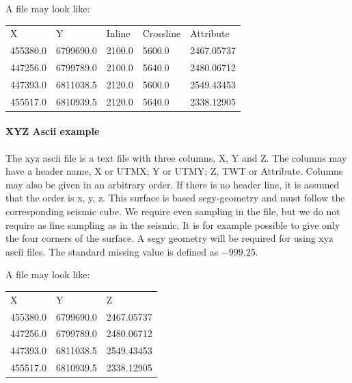 A file may look like:
\begin{table}[h]
\centering
\label{tab:multicolumnascii}
\begin{tabular}{lllll}

X         &         Y              &     Inline       &   Crossline     &    Attribute\\ 
455380.0    &        6799690.0   &        2100.0      &       5600.0       &       2467.05737 \\ 
447256.0    &        6799789.0    &       2100.0       &       5640.0      &        2480.06712\\ 
447393.0    &        6811038.5     &      2120.0      &        5600.0      &        2549.43453\\ 
455517.0    &        6810939.5     &      2120.0      &        5640.0      &        2338.12905\\ 
\end{tabular}
\end{table}

\paragraph{XYZ Ascii example}
The xyz ascii file is a text file with three columns, X, Y and Z. The columns may have a header name, X or UTMX; Y or UTMY; Z, TWT or Attribute. Columns may also be given in an arbitrary order. If there is no header line, it is assumed that the order is x, y, z. This surface is based segy-geometry and must follow the corresponding seismic cube. We require even sampling in the file, but we do not require as fine sampling as in the seismic. It is for example possible to give only the four corners of the surface. A segy geometry will be required for using xyz ascii files. The standard missing value is defined as $-999.25$.

A file may look like:
\begin{table}[h]
\centering
\label{tab:xyzascii}
\begin{tabular}{lll}

X         &         Y              &    Z\\ 
455380.0    &        6799690.0   &        2467.05737 \\ 
447256.0    &        6799789.0    &       2480.06712\\ 
447393.0    &        6811038.5     &      2549.43453\\ 
455517.0    &        6810939.5     &      2338.12905\\ 
\end{tabular}
\end{table}


